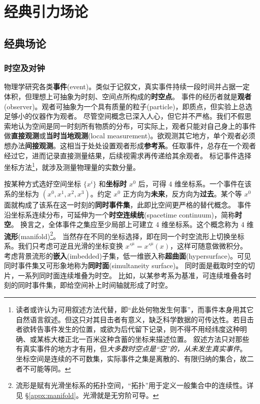 \chapter{经典引力场论}\label{chpt:GR}

\section{经典场论}
\subsection{时空及对钟}

物理学研究各类\textbf{事件}(event)。类似于记叙文，真实事件持续一段时间并占据一定体积，但理想上可抽象为时刻、空间点所构成的\textbf{时空点}。
事件的经历者就是\textbf{观者}(observer)。观者可抽象为一个具有质量的粒子(particle)，即质点，但实验上总选足够小的仪器作为观者。
尽管空间概念已深入人心，但它并不严格。我们不假思索地认为空间是同一时刻所有物质的分布，可实际上，观者只能对自己身上的事件做\textbf{直接观测}或\textbf{当时当地观测}(local measurement)。欲观测其它地方，单个观者必须想办法\textbf{间接观测}。这相当于处处设置观者形成\textbf{参考系}。任取事件，总存在一个观者经过它，进而记录直接测量结果，后续视需求再传递给其余观者。
标记事件选择坐标方法\footnote{读者或许认为可用叙述方法代替，即“此处何物发生何事”，而事件本身用其它自然语言叙述。但这只对其目击者有意义，缺乏科学数据的可传达性。若目击者欲转告事件发生的位置，或欲为后代留下记录，则不得不用经纬度这种明确、或某栋大楼正北一百米这种含蓄的坐标来描述位置。
叙述方法只对那些有真实事件的地方才有用，但\textit{大多数时空点是“空”的，从未发生真实事件}。
坐标空间是连续的不可数集，实际事件之集是离散的、有限归纳的集合，故二者不可能等同。}，就涉及测量物理量的实数分量。

按某种方式选好空间坐标 $\{x^i\}$ 和\textbf{坐标时} $x^0$ 后，可得 4 维坐标系。一个事件在该系的坐标为 $(x^0,x^1,x^2,x^3)$。约定 $x^0$ 正方向为\textbf{未来}，反方向为\textbf{过去}。某个等 $x^0$ 面就构成了该系在这一时刻的\textbf{同时事件集}，此即比空间更严格的替代概念。
事件沿坐标系连续分布，可延伸为一个\textbf{时空连续统}(spacetime continuum)，简称\textbf{时空}。
换言之，全体事件之集应至少局部上可建立 4 维坐标系。这个概念称为 4 维\textbf{流形}(manifold)\footnote{流形是赋有光滑坐标系的拓扑空间，“拓扑”用于定义一般集合中的连续性。详见 \S\ref{appx:manifold}。光滑就是无穷阶可导。}。
当然存在不同的坐标选择，即在同一个时空流形上切换坐标系。我们只考虑可逆且光滑的坐标变换 $x'^\mu=x'^\mu(x)$，这样可随意做微积分。
考虑背景流形的\textbf{嵌入}(imbedded)子集，低一维嵌入称\textbf{超曲面}(hypersurface)。可见同时事件集又可形象地称为\textbf{同时面}(simultaneity surface)。
同时面是截取时空的切片，一系列同时面连续堆叠为时空。
比如，以某参考系为基准，可连续堆叠各时刻的同时事件集，即给空间补上时间轴就形成了时空。

